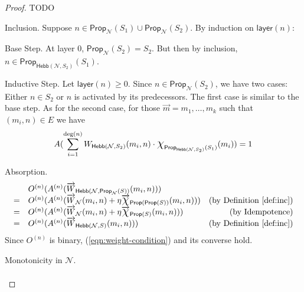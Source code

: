 \documentclass[letterpaper]{article}
\theoremstyle{definition}
\newcommand*{\bigchi}{\mbox{\Large$\chi$}}%
\newcommand{\degree}[1]{\mathrm{deg}(#1)}
\newcommand{\layer}[1]{\mathsf{layer}(#1)}
\newcommand{\Prop}{\textsf{Prop}}
\newcommand{\Hebb}{\textsf{Hebb}}
\newcommand{\Net}{\mathcal{N}}
\begin{document}
\begin{proof} TODO

\begin{compactdesc}
    \item[Inclusion.]
    Suppose $n \in \Prop_\Net(S_1) \cup \Prop_\Net(S_2)$.  By induction on $\layer{n}$:
    \begin{compactdesc}
        \item[Base Step.] At layer $0$, $\Prop_\Net(S_2) = S_2$.  But then by inclusion, $n \in \Prop_{\Hebb(\Net, S_2)}(S_1)$.
        \item[Inductive Step.] Let $\layer{n} \geq 0$.  Since $n \in \Prop_\Net(S_2)$, we have two cases: Either $n \in S_2$ or $n$ is activated by its predecessors.  The first case is similar to the base step.  As for the second case, for those $\vec{m} = m_1, \ldots, m_k$ such that $(m_i, n) \in E$ we have
        \[
            A(\sum_{i=1}^{\degree{n}} W_{\Hebb(\Net, S_2)}(m_i, n) \cdot \bigchi_{\Prop_{\Hebb(\Net, S_2)}(S_1)}(m_i)) = 1
        \]
    \end{compactdesc}
    
    \item[Absorption.] 
    \[
    \begin{array}{llr}
    
    &
    O^{(n)}(A^{(n)}(\overrightarrow{W}_{\Hebb(\Net, \Prop_{\Net}(S))}(m_i, n))) & 
    \\
    
    = &
    O^{(n)}(A^{(n)}(\overrightarrow{W}_{\Net}(m_i, n) + \eta \overrightarrow{\bigchi}_{\Prop(\Prop(S))}(m_i, n))) &
    \mbox{(by Definition~\ref{def:inc})}\\
    
    = &
    O^{(n)}(A^{(n)}(\overrightarrow{W}_{\Net}(m_i, n) + \eta \overrightarrow{\bigchi}_{\Prop(S)}(m_i, n))) &
    \mbox{(by Idempotence)}\\
    
    = &
    O^{(n)}(A^{(n)}(\overrightarrow{W}_{\Hebb(\Net, S)}(m_i, n))) & 
    \mbox{(by Definition~\ref{def:inc})}
    \end{array}
    \]
    Since $O^{(n)}$ is binary, (\ref{eqn:weight-condition}) and its converse hold.
    
    \item[Monotonicity in $\Net$.] 
    \[
    \begin{array}{llr}
    

\end{array}\]
\end{compactdesc}
\end{proof}
\end{document}
